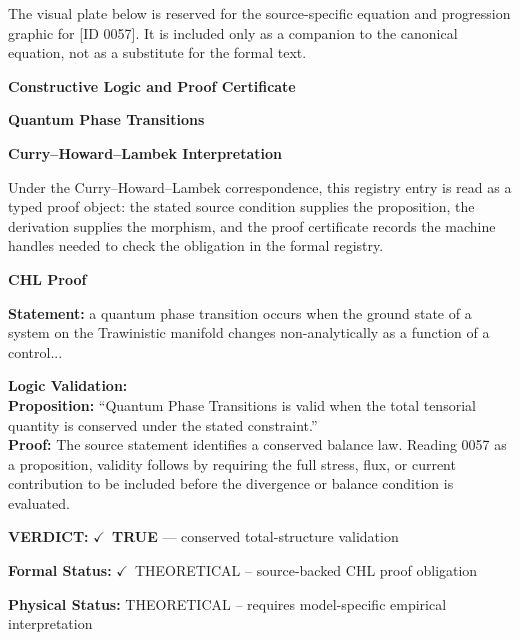 \begingroup\footnotesize\sloppy
The visual plate below is reserved for the source-specific equation and progression graphic for [ID 0057]. It is included only as a companion to the canonical equation, not as a substitute for the formal text.
\par\endgroup
\ifTZPDarkEdition
{}
\fi

\clearpage
\begingroup\tzpsupportsetup
\noindent\textbf{\fontsize{10.8pt}{12.8pt}\selectfont [ID 0057] Constructive Logic and Proof Certificate}\par
\noindent\textbf{\fontsize{10pt}{12pt}\selectfont Quantum Phase Transitions}\par
\vspace{0.45em}
\begingroup
\footnotesize
\setlength{\parskip}{0.22em}
\setlength{\parindent}{0pt}
\noindent\textbf{Curry--Howard--Lambek Interpretation}\par
Under the Curry--Howard--Lambek correspondence, this registry entry is read as a typed proof
object: the stated source condition supplies the proposition, the derivation supplies the
morphism, and the proof certificate records the machine handles needed to check the obligation
in the formal registry.

\vspace{0.45em}
\noindent\textbf{CHL Proof}\par
\textbf{Statement:} a quantum phase transition occurs when the ground state of a system on the Trawinistic
manifold changes non-analytically as a function of a control...

\textbf{Logic Validation:}\\
\textbf{Proposition:} ``Quantum Phase Transitions is valid when the total tensorial quantity is conserved under
the stated constraint.''\\
\textbf{Proof:} The source statement identifies a conserved balance law. Reading 0057 as a proposition,
validity follows by requiring the full stress, flux, or current contribution to be
included before the divergence or balance condition is evaluated.

\textbf{VERDICT:} \ensuremath{\checkmark}\ \textbf{TRUE} --- conserved total-structure validation

\textbf{Formal Status:} \ensuremath{\checkmark}\ THEORETICAL -- source-backed CHL proof obligation

\textbf{Physical Status:} THEORETICAL -- requires model-specific empirical interpretation
\par\vspace{0.45em}
\par
\ifTZPDarkEdition
{}
\fi
\endgroup
\endgroup
